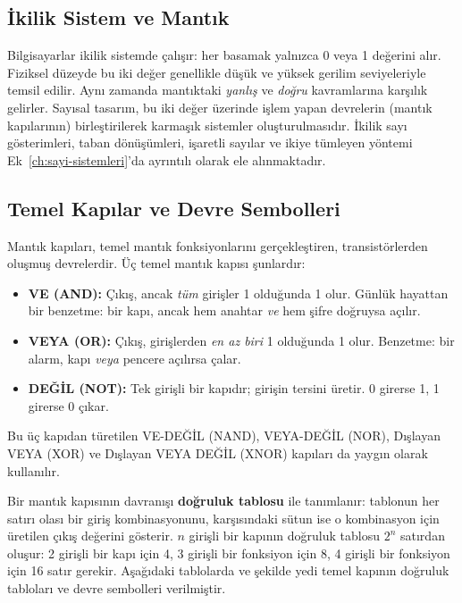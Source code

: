 \subsection{İkilik Sistem ve Mantık}

Bilgisayarlar ikilik sistemde çalışır: her basamak yalnızca 0 veya 1 değerini alır. Fiziksel düzeyde bu iki değer genellikle düşük ve yüksek gerilim seviyeleriyle temsil edilir. Aynı zamanda mantıktaki \emph{yanlış} ve \emph{doğru} kavramlarına karşılık gelirler. Sayısal tasarım, bu iki değer üzerinde işlem yapan devrelerin (mantık kapılarının) birleştirilerek karmaşık sistemler oluşturulmasıdır. İkilik sayı gösterimleri, taban dönüşümleri, işaretli sayılar ve ikiye tümleyen yöntemi Ek~\ref{ch:sayi-sistemleri}'da ayrıntılı olarak ele alınmaktadır.


\subsection{Temel Kapılar ve Devre Sembolleri}

Mantık kapıları, temel mantık fonksiyonlarını gerçekleştiren, transistörlerden oluşmuş devrelerdir. Üç temel mantık kapısı şunlardır:

\begin{itemize}[nosep]
    \item \textbf{VE (AND):} Çıkış, ancak \emph{tüm} girişler 1 olduğunda 1 olur. Günlük hayattan bir benzetme: bir kapı, ancak hem anahtar \emph{ve} hem şifre doğruysa açılır.
    \item \textbf{VEYA (OR):} Çıkış, girişlerden \emph{en az biri} 1 olduğunda 1 olur. Benzetme: bir alarm, kapı \emph{veya} pencere açılırsa çalar.
    \item \textbf{DEĞİL (NOT):} Tek girişli bir kapıdır; girişin tersini üretir. 0 girerse 1, 1 girerse 0 çıkar.
\end{itemize}

Bu üç kapıdan türetilen VE-DEĞİL (NAND), VEYA-DEĞİL (NOR), Dışlayan VEYA (XOR) ve Dışlayan VEYA DEĞİL (XNOR) kapıları da yaygın olarak kullanılır.

Bir mantık kapısının davranışı \textbf{doğruluk tablosu} ile tanımlanır: tablonun her satırı olası bir giriş kombinasyonunu, karşısındaki sütun ise o kombinasyon için üretilen çıkış değerini gösterir. $n$ girişli bir kapının doğruluk tablosu $2^n$ satırdan oluşur: 2 girişli bir kapı için 4, 3 girişli bir fonksiyon için 8, 4 girişli bir fonksiyon için 16 satır gerekir. Aşağıdaki tablolarda ve şekilde yedi temel kapının doğruluk tabloları ve devre sembolleri verilmiştir.

